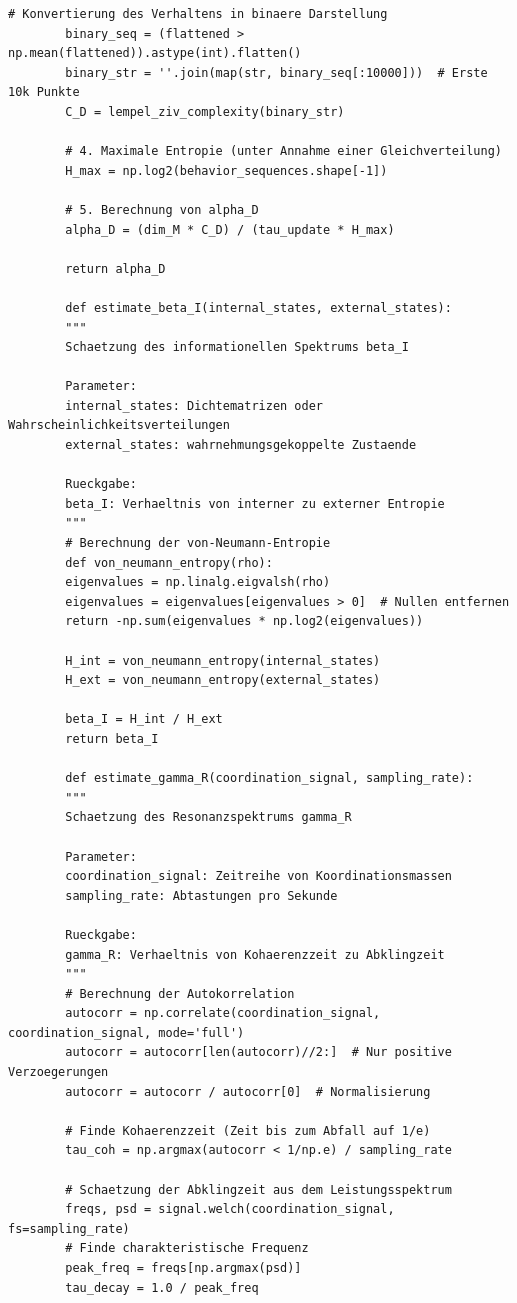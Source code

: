 \documentclass[12pt,a4paper]{article}
\begin{document}
\begin{lstlisting}[caption={Python-Code zur Schätzung von UCD-Parametern aus Zeitreihendaten}, label={lst:ucd-python}]
		# Konvertierung des Verhaltens in binaere Darstellung
		binary_seq = (flattened > np.mean(flattened)).astype(int).flatten()
		binary_str = ''.join(map(str, binary_seq[:10000]))  # Erste 10k Punkte
		C_D = lempel_ziv_complexity(binary_str)
		
		# 4. Maximale Entropie (unter Annahme einer Gleichverteilung)
		H_max = np.log2(behavior_sequences.shape[-1])
		
		# 5. Berechnung von alpha_D
		alpha_D = (dim_M * C_D) / (tau_update * H_max)
		
		return alpha_D
		
		def estimate_beta_I(internal_states, external_states):
		"""
		Schaetzung des informationellen Spektrums beta_I
		
		Parameter:
		internal_states: Dichtematrizen oder Wahrscheinlichkeitsverteilungen
		external_states: wahrnehmungsgekoppelte Zustaende
		
		Rueckgabe:
		beta_I: Verhaeltnis von interner zu externer Entropie
		"""
		# Berechnung der von-Neumann-Entropie
		def von_neumann_entropy(rho):
		eigenvalues = np.linalg.eigvalsh(rho)
		eigenvalues = eigenvalues[eigenvalues > 0]  # Nullen entfernen
		return -np.sum(eigenvalues * np.log2(eigenvalues))
		
		H_int = von_neumann_entropy(internal_states)
		H_ext = von_neumann_entropy(external_states)
		
		beta_I = H_int / H_ext
		return beta_I
		
		def estimate_gamma_R(coordination_signal, sampling_rate):
		"""
		Schaetzung des Resonanzspektrums gamma_R
		
		Parameter:
		coordination_signal: Zeitreihe von Koordinationsmassen
		sampling_rate: Abtastungen pro Sekunde
		
		Rueckgabe:
		gamma_R: Verhaeltnis von Kohaerenzzeit zu Abklingzeit
		"""
		# Berechnung der Autokorrelation
		autocorr = np.correlate(coordination_signal, coordination_signal, mode='full')
		autocorr = autocorr[len(autocorr)//2:]  # Nur positive Verzoegerungen
		autocorr = autocorr / autocorr[0]  # Normalisierung
		
		# Finde Kohaerenzzeit (Zeit bis zum Abfall auf 1/e)
		tau_coh = np.argmax(autocorr < 1/np.e) / sampling_rate
		
		# Schaetzung der Abklingzeit aus dem Leistungsspektrum
		freqs, psd = signal.welch(coordination_signal, fs=sampling_rate)
		# Finde charakteristische Frequenz
		peak_freq = freqs[np.argmax(psd)]
		tau_decay = 1.0 / peak_freq
		

\end{lstlisting}
\end{document}
